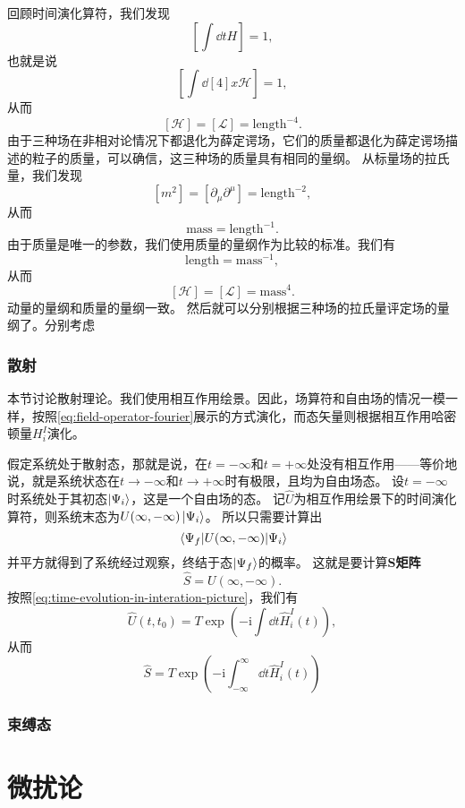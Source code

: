 \documentclass[hyperref, UTF8, a4paper]{ctexart}
\newcommand*{\ii}{\mathrm{i}}
\begin{document}
回顾时间演化算符，我们发现
\[
    \left[ \int \dd{t} H \right] = 1,
\]
也就是说
\[
    \left[ \int \dd[4]{x} \mathcal{H} \right] = 1,
\]
从而
\[
    [\mathcal{H}] = [\mathcal{L}] = \text{length}^{-4}.
\]
由于三种场在非相对论情况下都退化为薛定谔场，它们的质量都退化为薛定谔场描述的粒子的质量，可以确信，这三种场的质量具有相同的量纲。
从标量场的拉氏量，我们发现
\[
    [m^2] = [\partial_\mu \partial^\mu] = \text{length}^{-2},
\]
从而
\[
    \text{mass} = \text{length}^{-1}.
\]
由于质量是唯一的参数，我们使用质量的量纲作为比较的标准。我们有
\[
    \text{length} = \text{mass}^{-1},
\]
从而
\[
    [\mathcal{H}] = [\mathcal{L}] = \text{mass}^4.
\]
动量的量纲和质量的量纲一致。
然后就可以分别根据三种场的拉氏量评定场的量纲了。分别考虑

\subsubsection{散射}

本节讨论散射理论。我们使用相互作用绘景。因此，场算符和自由场的情况一模一样，按照\eqref{eq:field-operator-fourier}展示的方式演化，而态矢量则根据相互作用哈密顿量$H_i^I$演化。

假定系统处于散射态，那就是说，在$t=-\infty$和$t=+\infty$处没有相互作用——等价地说，就是系统状态在$t \to -\infty$和$t \to +\infty$时有极限，且均为自由场态。
设$t = -\infty$时系统处于其初态$\ket{\Psi_i}$，这是一个自由场的态。
记$\hat{U}$为相互作用绘景下的时间演化算符，则系统末态为$U(\infty, -\infty) \ket{\Psi_i}$。
所以只需要计算出
\[
    \mel{\Psi_f}{U(\infty, -\infty)}{\Psi_i}
\]
并平方就得到了系统经过观察，终结于态$\ket{\Psi_f}$的概率。
这就是要计算\textbf{S矩阵}
\begin{equation}
    \hat{S} = U(\infty, -\infty).
\end{equation}
按照\eqref{eq:time-evolution-in-interation-picture}，我们有
\[
    \hat{U}(t, t_0) = T \exp \left( - \ii \int \dd{t} \hat{H}_i^I(t) \right),
\]
从而
\begin{equation}
    \hat{S} = T \exp \left( - \ii \int_{-\infty}^\infty \dd{t} \hat{H}_i^I(t) \right)
\end{equation}


\subsubsection{束缚态}

\section{微扰论}
\end{document}
